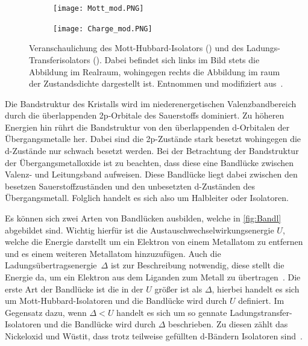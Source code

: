         \begin{figure}
            \centering
            \begin{subfigure}{0.48\textwidth}
                \centering
                \texttt{[image: Mott\_mod.PNG]}
                \subcaption{}
                \label{fig:Mott}
            \end{subfigure}
            \begin{subfigure}{0.48\textwidth}
                \centering
                \texttt{[image: Charge\_mod.PNG]}
                \subcaption{}
                \label{fig:Charge}
            \end{subfigure}
            \caption{Veranschaulichung des Mott-Hubbard-Isolators () und des Ladungs-Transferisolators ().
            Dabei befindet sich links im Bild stets die Abbildung im Realraum, wohingegen rechts die Abbildung im raum der Zustandsdichte dargestellt ist.
            Entnommen und modifiziert aus~\cite{stohr_magnetism_2006}.}
            \label{fig:Bandl}
        \end{figure}
        Die Bandstruktur des Kristalls wird im niederenergetischen Valenzbandbereich durch die überlappenden 2p-Orbitale des Sauerstoffs dominiert.
        Zu höheren Energien hin rührt die Bandstruktur von den überlappenden d-Orbitalen der Übergangsmetalle her.
        Dabei sind die 2p-Zustände stark besetzt wohingegen die d-Zustände nur schwach besetzt werden.
        Bei der Betrachtung der Bandstruktur der Übergangsmetalloxide ist zu beachten, dass diese eine Bandlücke zwischen Valenz- und Leitungsband aufweisen.
        Diese Bandlücke liegt dabei zwischen den besetzen Sauerstoffzuständen und den unbesetzten d-Zuständen des Übergangsmetall.
        Folglich handelt es sich also um Halbleiter oder Isolatoren.

        Es können sich zwei Arten von Bandlücken ausbilden, welche in \autoref{fig:Bandl} abgebildet sind.
        Wichtig hierfür ist die Austauschwechselwirkungsenergie $U$, welche die Energie darstellt um ein Elektron von einem Metallatom zu entfernen und es einem weiteren Metallatom hinzuzufügen.
        Auch die Ladungsübertragsenergie~$\Delta$ ist zur Beschreibung notwendig, diese stellt die Energie da, um ein Elektron aus dem Liganden zum Metall zu übertragen~\cite{stohr_magnetism_2006}.
        Die erste Art der Bandlücke ist die in der $U$ größer ist als $\Delta$, hierbei handelt es sich um Mott-Hubbard-Isolatoren und die Bandlücke wird durch $U$ definiert.
        Im Gegensatz dazu, wenn $\Delta < U$ handelt es sich um so gennate Ladungstransfer-Isolatoren und die Bandlücke wird durch $\Delta$ beschrieben.
        Zu diesen zählt das Nickeloxid und Wüstit, dass trotz teilweise gefüllten d-Bändern Isolatoren sind~\cite{IF_5}.

